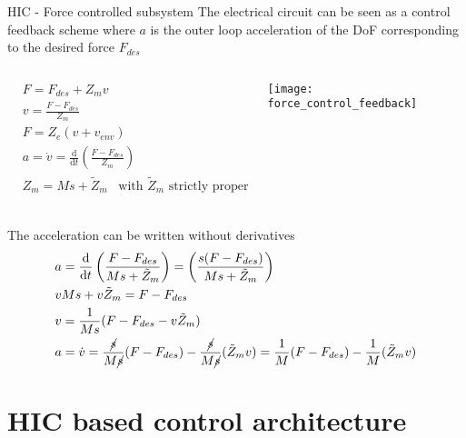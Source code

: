 \begin{frame}[shrink=30]{HIC - Force controlled subsystem}
  The electrical circuit \alert{can be seen as a control feedback scheme where $a$ is the outer loop
  acceleration} of the DoF corresponding to the desired force $F_{des}$
  \begin{columns}
    \begin{column}{0.4\textwidth}
      \begin{align*}
        &F = F_{des} + Z_m v\\
        &v = \frac{F - F_{des}}{Z_m}\\
        &F = Z_e(v + v_{env})\\
        &a = \dot{v} = \frac{\mathrm{d}}{\mathrm{d}t} \left(\frac{F - F_{des}}{Z_m} \right)\\
        &Z_m = M s + \tilde{Z}_m \enspace \text{ with } \tilde{Z}_m \text{ strictly proper}\\
      \end{align*}
    \end{column}
    \begin{column}{0.5\textwidth}
      \centering
      \texttt{[image: force\_control\_feedback]}
    \end{column}
  \end{columns}
  The acceleration can be written \alert{without derivatives}
  \begin{align*}
    &a = \frac{\mathrm{d}}{\mathrm{d}t} \left(\frac{F - F_{des}}{Ms + \tilde{Z}_m} \right) = \left(\frac{s(F - F_{des})}{Ms + \tilde{Z}_m} \right)\\
    &vMs + v \tilde{Z}_m = F - F_{des}\\
    &v = \frac{1}{Ms} (F - F_{des} - v \tilde{Z}_m )\\
    &a = \dot{v} = \frac{\cancel{s}}{M\cancel{s}} (F - F_{des}) - \frac{\cancel{s}}{M\cancel{s}}( \tilde{Z}_m v) = \frac{1}{M} (F - F_{des}) - \frac{1}{M}( \tilde{Z}_m v)
  \end{align*}
\end{frame}

\section{HIC based control architecture}

